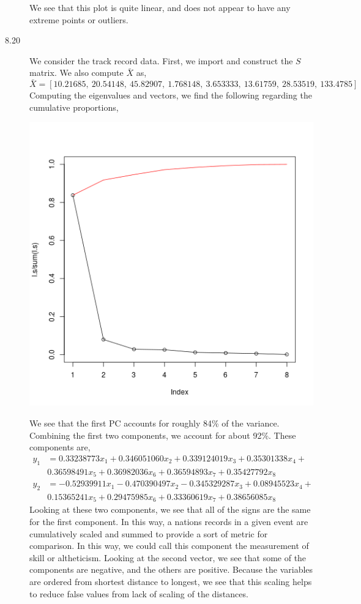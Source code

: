 \documentclass[letterpaper,10pt]{article}
\begin{document}
\begin{description}
\begin{center}
\end{center}
We see that this plot is quite linear, and does not appear to have any extreme points or outliers.
\item[8.20] We consider the track record data. First, we import and construct the $S$ matrix. We also compute $\bar{X}$ as,
\[\bar{X}=[10.21685,\ 20.54148,\ 45.82907,\ 1.768148,\ 3.653333,\ 13.61759,\ 28.53519,\ 133.4785]\]
Computing the eigenvalues and vectors, we find the following regarding the cumulative proportions,
\begin{center}
\includegraphics[scale=.75]{cumvval.png}
\end{center}
We see that the first PC accounts for roughly 84\% of the variance. Combining the first two components, we account for about 92\%. These components are,
\begin{align*}
y_1 &=0.33238773x_1+0.346051060x_2 +0.339124019x_3+ 0.35301338x_4+ \\
& 0.36598491x_5+ 0.36982036x_6+ 0.36594893x_7+ 0.35427792x_8\\
y_2 &= -0.52939911x_1 -0.470390497x_2 -0.345329287x_3 + 0.08945523x_4+ \\
& 0.15365241x_5+  0.29475985x_6+  0.33360619x_7+  0.38656085x_8
\end{align*}
Looking at these two components, we see that all of the signs are the same for the first component. In this way, a nations records in a given event are cumulatively scaled and summed to provide a sort of metric for comparison. In this way, we could call this component the measurement of skill or altheticism. Looking at the second vector, we see that some of the components are negative, and the others are positive. Because the variables are ordered from shortest distance to longest, we see that this scaling helps to reduce false values from lack of scaling of the distances.\\

\end{description}
\end{document}
